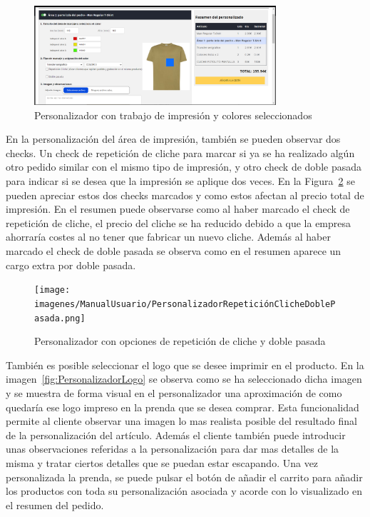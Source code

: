 \documentclass[12pt]{article}
\begin{document}
\begin{figure}[ht]
    \centering
    \includegraphics[width=0.8\textwidth]{imagenes/ManualUsuario/PersonalizadorArea1ColoresSeleccionados.png}
    \caption{\label{fig:PersonalizadorColores}Personalizador con trabajo de impresión y colores seleccionados}
    \vspace{\fill}
\end{figure}

En la personalización del área de impresión, también se pueden observar dos checks. Un check de repetición de cliche para marcar si ya se ha realizado algún otro pedido similar con el mismo tipo de impresión,
y otro check de doble pasada para indicar si se desea que la impresión se aplique dos veces. En la Figura~\ref{fig:PersonalizadorCheckboxes} se pueden apreciar estos dos checks marcados y como estos
afectan al precio total de impresión. En el resumen puede observarse como al haber marcado el check de repetición de cliche, el precio del cliche se ha reducido debido a que la empresa ahorraría costes al no tener que 
fabricar un nuevo cliche. Además al haber marcado el check de doble pasada se observa como en el resumen aparece un cargo extra por doble pasada.

\begin{figure}[ht]
    \centering
    \texttt{[image: imagenes/ManualUsuario/PersonalizadorRepeticiónClicheDoblePasada.png]}
    \caption{\label{fig:PersonalizadorCheckboxes}Personalizador con opciones de repetición de cliche y doble pasada}
    \vspace{\fill}
\end{figure}

También es posible seleccionar el logo que se desee imprimir en el producto. En la imagen~\ref{fig:PersonalizadorLogo} se observa como se ha seleccionado dicha imagen y se muestra de forma visual en el personalizador una 
aproximación de como quedaría ese logo impreso en la prenda que se desea comprar. Esta funcionalidad permite al cliente observar una imagen lo mas realista posible del resultado final
de la personalización del artículo. Además el cliente también puede introducir unas observaciones referidas a la personalización para dar mas detalles de la misma y tratar ciertos detalles que se puedan
estar escapando. Una vez personalizada la prenda, se puede pulsar el botón de añadir el carrito para añadir los productos con toda su personalización asociada y acorde con
lo visualizado en el resumen del pedido.
\end{document}
